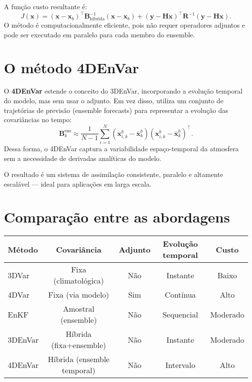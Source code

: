 A função custo resultante é:
\[
J(\mathbf{x}) = (\mathbf{x} - \mathbf{x}_b)^\top \mathbf{B}_{\text{híbrida}}^{-1} (\mathbf{x} - \mathbf{x}_b)
+ (\mathbf{y} - \mathbf{H}\mathbf{x})^\top \mathbf{R}^{-1} (\mathbf{y} - \mathbf{H}\mathbf{x}).
\]
O método é computacionalmente eficiente, pois não requer operadores adjuntos e pode ser executado em paralelo para cada membro do ensemble.

\section{O método 4DEnVar}
O \textbf{4DEnVar} estende o conceito do 3DEnVar, incorporando a evolução temporal do modelo, mas sem usar o adjunto.  
Em vez disso, utiliza um conjunto de trajetórias de previsão (ensemble forecasts) para representar a evolução das covariâncias no tempo:
\[
\mathbf{B}_k^{\text{ens}} \approx \frac{1}{N-1} \sum_{i=1}^N (\mathbf{x}_{i,k}^b - \bar{\mathbf{x}}_k^b)
(\mathbf{x}_{i,k}^b - \bar{\mathbf{x}}_k^b)^\top.
\]
Dessa forma, o 4DEnVar captura a variabilidade espaço-temporal da atmosfera sem a necessidade de derivadas analíticas do modelo.

O resultado é um sistema de assimilação consistente, paralelo e altamente escalável — ideal para aplicações em larga escala.

\section{Comparação entre as abordagens}
\begin{center}
\begin{tabular}{lcccc}
\toprule
\textbf{Método} & \textbf{Covariância} & \textbf{Adjunto} & \textbf{Evolução temporal} & \textbf{Custo} \\
\midrule
3DVar & Fixa (climatológica) & Não & Instante & Baixo \\
4DVar & Fixa (via modelo) & Sim & Contínua & Alto \\
EnKF & Amostral (ensemble) & Não & Sequencial & Moderado \\
3DEnVar & Híbrida (fixa+ensemble) & Não & Instante & Moderado \\
4DEnVar & Híbrida (ensemble temporal) & Não & Intervalo & Alto \\
\bottomrule
\end{tabular}
\end{center}

